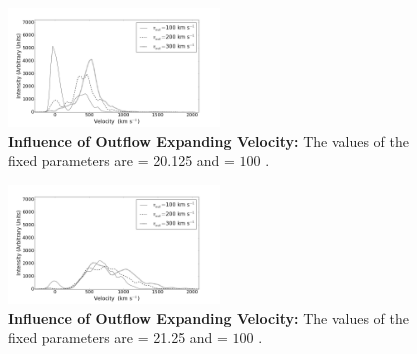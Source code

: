\documentclass{latex/emulateapj}
\begin{document}
\begin{figure}[h!]
\begin{center}
  \includegraphics[width=0.5\textwidth]{./figures/inf_vout1_soft.png}
\end{center}
\caption{\textbf{Influence of Outflow Expanding Velocity:} The values of the fixed parameters are \lognh = 20.125 and \vrot = $100$ \kms.\\
\label{fig:influence_vout1}}
\end{figure}

\begin{figure}[h!]
\begin{center}
  \includegraphics[width=0.5\textwidth]{./figures/inf_vout2_soft.png}
\end{center}
\caption{\textbf{Influence of Outflow Expanding Velocity:} The values of the fixed parameters are \lognh = 21.25 and \vrot = $100$ \kms.\\
\label{fig:influence_vout2}}
\end{figure}
\end{document}
